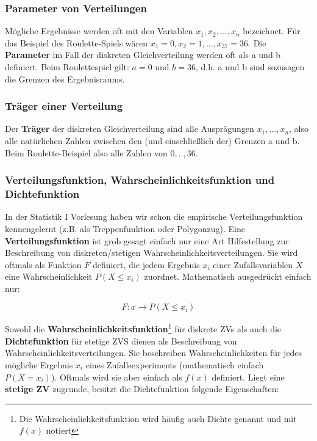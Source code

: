 \documentclass[a4paper]{article}
\begin{document}
\subsubsection{Parameter von Verteilungen}\label{sec:Param}

Mögliche Ergebnisse werden oft mit den Variablen $x_1,x_2,...,x_n$ bezeichnet. Für das Beispiel des Roulette-Spiels wären $x_1=0,x_2=1,...,x_{37}=36$. Die \textbf{Parameter} im Fall der diskreten Gleichverteilung werden oft als a und b definiert. Beim Roulettespiel gilt: $a = 0$ und $b = 36$, d.h. a und b sind sozusagen die Grenzen des Ergebnisraums.

\subsubsection{Träger einer Verteilung} \label{sec:Träger}
Der \textbf{Träger} der diskreten Gleichverteilung sind alle Ausprägungen $x_1,...,x_n$, also alle natürlichen Zahlen zwischen den (und einschließlich der) Grenzen a und b. Beim Roulette-Beispiel also alle Zahlen von $0,..,36$. 

\subsubsection{Verteilungsfunktion, Wahrscheinlichkeitsfunktion und Dichtefunktion} \label{sec:Functions}
In der Statistik I Vorlesung haben wir schon die empirische Verteilungsfunktion kennengelernt (z.B. als Treppenfunktion oder Polygonzug). Eine \textbf{Verteilungsfunktion} ist grob gesagt einfach nur eine Art Hilfestellung zur Beschreibung von diskreten/stetigen Wahrscheinlichkeitsverteilungen. Sie wird oftmals als Funktion $F$ definiert, die jedem Ergebnis $x_i$ einer Zufallsvariablen $X$ eine Wahrscheinlichkeit $P(X \leq x_i)$ zuordnet. Mathematisch ausgedrückt einfach nur:

\begin{equation*}
F: x \rightarrow P(X \leq x_i)
\end{equation*}

\noindent Sowohl die \textbf{Wahrscheinlichkeitsfunktion}\footnote{Die Wahrscheinlichkeitsfunktion wird häufig auch Dichte genannt und mit $f(x)$ notiert} für diskrete ZVs als auch die \textbf{Dichtefunktion} für stetige ZVS dienen als Beschreibung von Wahrscheinlichkeitsverteilungen. Sie beschreiben Wahrscheinlichkeiten für jedes mögliche Ergebnis $x_i$ eines Zufallsexperiments (mathematisch einfach $P(X=x_i)$). Oftmals wird sie aber einfach als $f(x)$ definiert. Liegt eine \textbf{stetige ZV} zugrunde, besitzt die Dichtefunktion folgende Eigenschaften:
\end{document}
